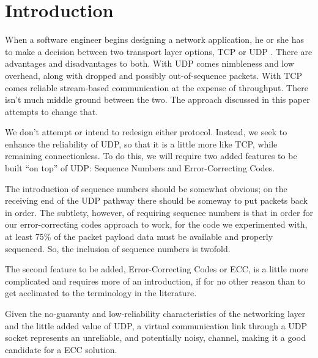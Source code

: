 \documentclass[conference]{IEEEtran}
\theoremstyle{definition}
\begin{document}
%
\IEEEpeerreviewmaketitle



\section{Introduction}
When a software engineer begins designing a
network application, he or she has to make a decision between
two transport layer options, TCP or UDP \cite{kurose2012computer}.
There are advantages and disadvantages to both.  With UDP comes
nimbleness and low overhead, along with dropped and possibly
out-of-sequence packets.  With TCP comes reliable stream-based
communication at the expense of throughput.  There isn't much
middle ground between the two.  The approach discussed in this
paper attempts to change that.

We don't attempt or intend to redesign either protocol.  Instead,
we seek to enhance the reliability of UDP, so that it is a little
more like TCP, while remaining connectionless.  To do this, we
will require two added features to be built ``on top'' of UDP:
Sequence Numbers and Error-Correcting Codes.

The introduction of sequence numbers should be somewhat obvious;
on the receiving end of the UDP pathway there should be someway
to put packets back in order.  The subtlety, however, of requiring
sequence numbers is that in order for our error-correcting codes
approach to work, for the code we experimented with, at least 75\%
of the packet payload data must be available and properly
sequenced.  So, the inclusion of sequence numbers is twofold.

The second feature to be added, Error-Correcting Codes or ECC, is a
little more complicated and requires more of an introduction,
if for no other reason than to get acclimated to the terminology
in the literature.

Given the no-guaranty and low-reliability characteristics of
the networking layer and the little added value of UDP,
a virtual communication link through a UDP socket represents
an unreliable, and potentially noisy, channel, making it
a good candidate for a ECC solution.
\end{document}
